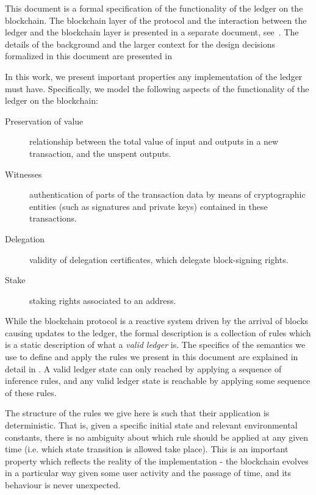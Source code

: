 This document is a formal specification of the functionality of the ledger
on the blockchain. The blockchain layer of the
protocol and the interaction between the ledger and the blockchain
layer is presented in a separate document, see~\cite{}. The details of the
background and the larger context
for the design decisions formalized in this document are presented
in~\cite{delegation_design}

In this work,
we present important properties any implementation of the ledger must have.
Specifically, we model the following aspects
of the functionality of the ledger on the blockchain:

\begin{description}
\item[Preservation of value] relationship between the total value of input and
  outputs in a new transaction, and the unspent outputs.
\item[Witnesses] authentication of parts of the transaction data by means of
  cryptographic entities (such as signatures and private keys) contained in
  these transactions.
\item[Delegation] validity of delegation certificates, which delegate
  block-signing rights.
\item[Stake] staking rights associated to an address.
\end{description}

While the blockchain protocol is a reactive system driven by the arrival
of blocks causing updates to the ledger, the formal description is a collection
of rules which is a
static description of what a \textit{valid ledger} is. The specifics of the
semantics we use to define and apply
the rules we present in this document are explained in detail in
\cite{small_step_semantics}. A valid ledger state can only
reached by applying a sequence of inference rules, and any valid ledger state
is reachable by applying some sequence of these rules.

The structure of the rules we give here is such that their application is
deterministic. That is, given a specific initial state and relevant environmental
constants, there is no ambiguity
about which rule should be applied at any given time (i.e. which state
transition is allowed take place). This is an important property which reflects
the reality of the implementation - the blockchain evolves in a particular way
given some user activity and the passage of time, and its behaviour is
never unexpected.
